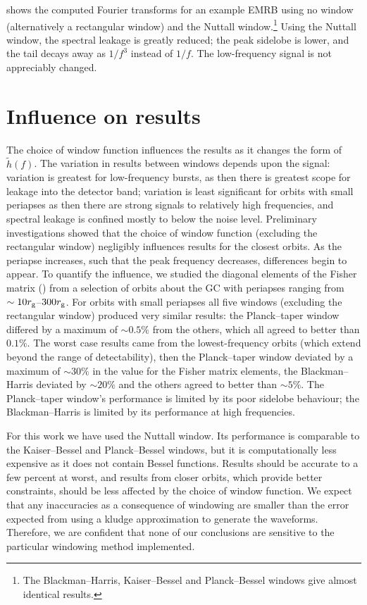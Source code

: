  shows the computed Fourier transforms for an example EMRB using no window (alternatively a rectangular window) and the Nuttall window.\footnote{The Blackman--Harris, Kaiser--Bessel and Planck--Bessel windows give almost identical results.} Using the Nuttall window, the spectral leakage is greatly reduced; the peak sidelobe is lower, and the tail decays away as $1/{f^3}$ instead of $1/{f}$. The low-frequency signal is not appreciably changed.

\section{Influence on results}

The choice of window function influences the results as it changes the form of $\widetilde{h}(f)$. The variation in results between windows depends upon the signal: variation is greatest for low-frequency bursts, as then there is greatest scope for leakage into the detector band; variation is least significant for orbits with small periapses as then there are strong signals to relatively high frequencies, and spectral leakage is confined mostly to below the noise level. Preliminary investigations showed that the choice of window function (excluding the rectangular window) negligibly influences results for the closest orbits. As the periapse increases, such that the peak frequency decreases, differences begin to appear. To quantify the influence, we studied the diagonal elements of the Fisher matrix () from a selection of orbits about the GC with periapses ranging from $\sim 10 r_\mathrm{g}$--$300 r_\mathrm{g}$. For orbits with small periapses all five windows (excluding the rectangular window) produced very similar results: the Planck--taper window differed by a maximum of $\sim 0.5\%$ from the others, which all agreed to better than $0.1\%$. The worst case results came from the lowest-frequency orbits (which extend beyond the range of detectability), then the Planck--taper window deviated by a maximum of $\sim 30\%$ in the value for the Fisher matrix elements, the Blackman--Harris deviated by $\sim 20\%$ and the others agreed to better than $\sim 5\%$. The Planck--taper window's performance is limited by its poor sidelobe behaviour; the Blackman--Harris is limited by its performance at high frequencies.

For this work we have used the Nuttall window. Its performance is comparable to the Kaiser--Bessel and Planck--Bessel windows, but it is computationally less expensive as it does not contain Bessel functions. Results should be accurate to a few percent at worst, and results from closer orbits, which provide better constraints, should be less affected by the choice of window function. We expect that any inaccuracies as a consequence of windowing are smaller than the error expected from using a kludge approximation to generate the waveforms. Therefore, we are confident that none of our conclusions are sensitive to the particular windowing method implemented.

